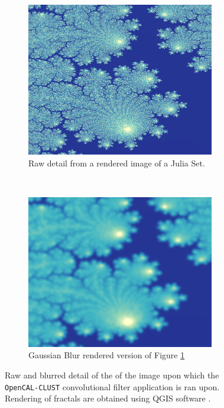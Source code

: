 \begin{figure}[!t]
    \begin{subfigure}[t]{0.5\textwidth}
        \centering
        \includegraphics[width=0.9\textwidth]{./images/opencal/frattale0_detail}
        \caption{Raw detail from a rendered image of a Julia Set.}
            \label{fig:fractal_detail_raw}
    \end{subfigure}%
~
    \begin{subfigure}[t]{0.5\textwidth}
        \centering
        \includegraphics[width=0.9\textwidth]{./images/opencal/frattale1_blur_100_detail}
        \caption{Gaussian Blur rendered version of Figure \ref{fig:fractal_detail_raw}}
                \label{fig:fractal_detail_blur}
    \end{subfigure}
\caption[Raw and blurred detail of the of the image upon which the \texttt{OpenCAL-CLUST}  convolutional filter application is ran upon.]{Raw and blurred detail of the of the image upon which the \texttt{OpenCAL-CLUST}  convolutional filter application is ran upon. Rendering of fractals are obtained using QGIS software \cite{QGIS_software}.}
\label{fig:fractal_detail}
\end{figure}


